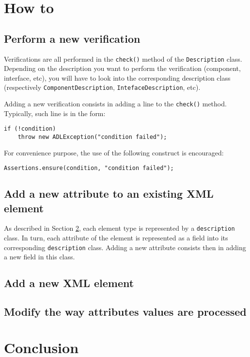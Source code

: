 \documentclass{article}
\newcommand{\code}[1]{\texttt{#1}}
\begin{document}
\section{How to}

\subsection{Perform a new verification}

Verifications are all performed in the \code{check()} method of the \code{Description}
class. Depending on the description you want to perform the verification (component, interface, etc),
you will have to look into the corresponding description class (respectively \code{ComponentDescription},
\code{IntefaceDescription}, etc).

Adding a new verification consists in adding a line to the \code{check()} method. Typically, such line
is in the form:

\begin{lstlisting}
if (!condition)
	throw new ADLException("condition failed");
\end{lstlisting}

For convenience purpose, the use of the following construct is encouraged:

\begin{lstlisting}
Assertions.ensure(condition, "condition failed");
\end{lstlisting}



\subsection{Add a new attribute to an existing XML element}

As described in Section \ref{}, each element type is represented by a \code{description} class.
In turn, each attribute of the element is represented as a field into its corresponding \code{description} class.
Adding a new attribute consists then in adding a new field in this class.

\subsection{Add a new XML element}

\subsection{Modify the way attributes values are processed}


\section{Conclusion}
\end{document}
